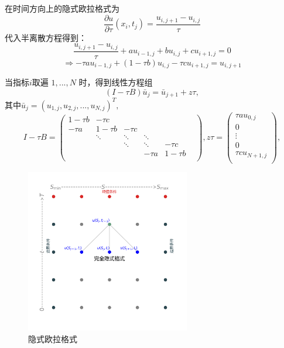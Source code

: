 \documentclass{article}
\begin{document}
在时间方向上的隐式欧拉格式为$$\frac{\partial u}{\partial \tau}(x_i, t_j) = \frac{u_{i, j+1} - u_{i, j}}{\tau}$$
代入半离散方程得到：$$\frac{u_{i, j+1} - u_{i, j}}{\tau} + au_{i-1, j} + bu_{i, j} + cu_{i+1, j} = 0$$
$$\Rightarrow -\tau au_{i-1, j} + (1 - \tau b)u_{i, j} - \tau cu_{i+1, j} = u_{i, j+1}$$

当指标$i$取遍 $1,...,N$ 时，得到线性方程组$$(I - \tau B)\bar{u}_{j} = \bar{u}_{j+1} + z\tau,$$
其中$\bar{u}_{j} = (u_{1, j}, u_{2, j},...,u_{N, j})^T,$
$$
I - \tau B = \begin{pmatrix}
                1 -\tau b  &   -\tau c    &            &            &            & \\
                -\tau a    &   1 -\tau b  &   -\tau c  &            &            & \\
                           &   \ddots     &   \ddots   &   \ddots   &            & \\
                           &              &   \ddots   &   \ddots   &  -\tau c   & \\
                           &              &            &   -\tau a  &  1 -\tau b & \\
            \end{pmatrix},
z\tau = \begin{pmatrix}
            \tau au_{0, j}   \\
            0                \\
            \vdots           \\
            0                \\
            \tau cu_{N+1, j} \\
        \end{pmatrix},
$$


\begin{figure}[H]
  \centering
  \includegraphics[width=0.64\textwidth,height=0.64\textwidth]{Images/3_ImpEu.png}
  \caption{隐式欧拉格式}
  \label{fig:3_ImpEu}
\end{figure} 
\end{document}
